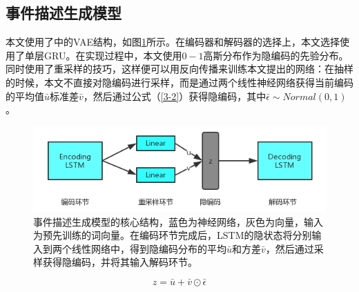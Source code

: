 

\subsection{事件描述生成模型}
本文使用了中的VAE结构，如图\ref{f3-2}所示。在编码器和解码器的选择上，本文选择使用了单层GRU。在实现过程中，本文使用$0-1$高斯分布作为隐编码的先验分布。同时使用了重采样的技巧，这样便可以用反向传播来训练本文提出的网络：在抽样的时候，本文不直接对隐编码进行采样，而是通过两个线性神经网络获得当前编码的平均值$\bar{u}$标准差$\bar{v}$，然后通过公式（\ref{3-2}）获得隐编码，其中$\bar\epsilon \sim Normal(0,1)$。
\begin{figure}[htb]\label{f3-2}
    \centering
    \includegraphics[width=11.3cm]{vae.png}
    \caption{事件描述生成模型的核心结构，蓝色为神经网络，灰色为向量，输入为预先训练的词向量。在编码环节完成后，LSTM的隐状态将分别输入到两个线性网络中，得到隐编码分布的平均$\bar{u}$和方差$\bar{v}$，然后通过采样获得隐编码，并将其输入解码环节。}
\end{figure}
\begin{equation}\label{3-2}
    z=\bar{u}+\bar{v}\odot \bar\epsilon
\end{equation}

